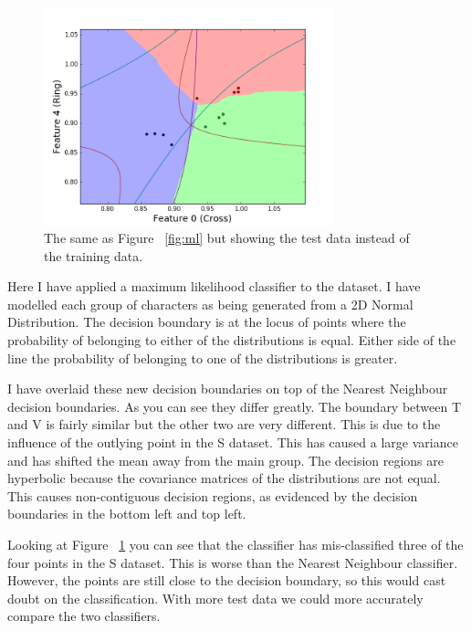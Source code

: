\documentclass[11pt, a4paper]{article}
\begin{document}
\begin{figure}[ht]
	\centering
	\includegraphics[trim={0 0 0 1cm},clip,width=0.75\textwidth]{max_likelihood_test.png}
	\caption{The same as Figure ~\ref{fig:ml} but showing the test data instead of the training data.}
	\label{fig:ml_test}
\end{figure}

Here I have applied a maximum likelihood classifier to the dataset. I have modelled each group of characters as being generated from a 2D Normal Distribution. The decision boundary is at the locus of points where the probability of belonging to either of the distributions is equal. Either side of the line the probability of belonging to one of the distributions is greater.

I have overlaid these new decision boundaries on top of the Nearest Neighbour decision boundaries. As you can see they differ greatly. The boundary between T and V is fairly similar but the other two are very different. This is due to the influence of the outlying point in the S dataset. This has caused a large variance and has shifted the mean away from the main group. The decision regions are hyperbolic because the covariance matrices of the distributions are not equal. This causes non-contiguous decision regions, as evidenced by the decision boundaries in the bottom left and top left. 

Looking at Figure ~\ref{fig:ml_test} you can see that the classifier has mis-classified three of the four points in the S dataset. This is worse than the Nearest Neighbour classifier. However, the points are still close to the decision boundary, so this would cast doubt on the classification. With more test data we could more accurately compare the two classifiers. 
\end{document}
